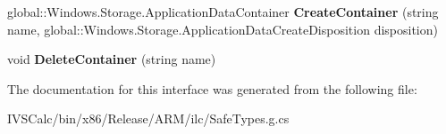\begin{DoxyCompactItemize}
\item 
\mbox{\label{interface_windows_1_1_storage_1_1_i_application_data_container_ad3ca0020aa9ff4735e605413e9948f61}} 
global\+::\+Windows.\+Storage.\+Application\+Data\+Container {\bfseries Create\+Container} (string name, global\+::\+Windows.\+Storage.\+Application\+Data\+Create\+Disposition disposition)
\item 
\mbox{\label{interface_windows_1_1_storage_1_1_i_application_data_container_a900abad7d6853503cdd95e3d82cd2867}} 
void {\bfseries Delete\+Container} (string name)
\end{DoxyCompactItemize}


The documentation for this interface was generated from the following file\+:\begin{DoxyCompactItemize}
\item 
I\+V\+S\+Calc/bin/x86/\+Release/\+A\+R\+M/ilc/Safe\+Types.\+g.\+cs\end{DoxyCompactItemize}

